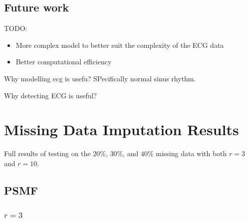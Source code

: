 \documentclass{mldsmsc}
\begin{document}
\section{Future work}

TODO:
\begin{itemize}
    \item More complex model to better suit the complexity of the ECG data
    \item Better computational efficiency
\end{itemize}

Why modelling ecg is usefu? SPecifically normal sinus rhythm.

Why detecting ECG is useful?

\clearpage
\renewcommand*{\thepage}{A\arabic{page}}

\appendix

\chapter{Missing Data Imputation Results}\label{app:mdi}

Full results of testing on the $20\%$, $30\%$, and $40\%$ missing data with both $r = 3$ and $r = 10$.

\section{PSMF}

\subsection{$r = 3$}
\end{document}
